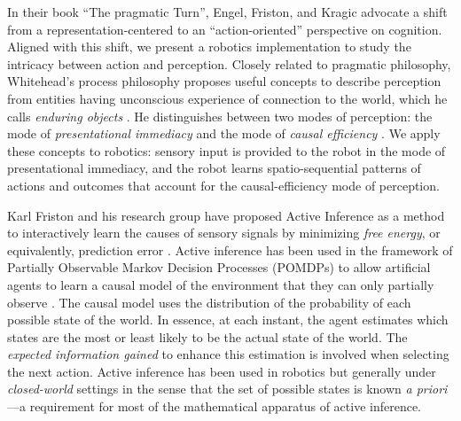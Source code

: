 \documentclass[runningheads]{llncs}
\begin{document}
In their book ``The pragmatic Turn'', Engel, Friston, and Kragic \cite{engel_pragmatic_2015} advocate a shift from a representation-centered to an ``action-oriented'' perspective on cognition.  
Aligned with this shift, we present a robotics implementation to study the intricacy between action and perception.
Closely related to pragmatic philosophy, Whitehead's process philosophy proposes useful concepts to describe perception from entities 
having unconscious experience of connection to the world,
which he calls \textit{enduring objects} \cite{whitehead1929}. 
He distinguishes between two modes of perception: the mode of \textit{presentational immediacy} and the mode of \textit{causal efficiency} \cite{smith_social_2010}. 
We apply these concepts to robotics: sensory input is provided to the robot in the mode of presentational immediacy, and the robot learns spatio-sequential patterns of actions and outcomes that account for the causal-efficiency mode of perception. 


Karl Friston and his research group have proposed Active Inference as a method to interactively  learn the causes of sensory signals  by minimizing \textit{free energy}, or equivalently, prediction error \cite{friston_free-energy_2010}.
Active inference has been used in the framework of Partially Observable Markov Decision Processes (POMDPs) to allow artificial agents to learn a causal model of the environment that they can only partially observe \cite{smith_step-by-step_2022}. 
The causal model uses the distribution of the probability of each possible state of the world. 
In essence, at each instant, the agent estimates which states are the most or least likely to be the actual state of the world.
The \textit{expected information gained} to enhance this estimation is involved when selecting the next action.
Active inference has been used in robotics \cite{lanillos_active_2021} but generally under \textit{closed-world} settings in the sense that the set of possible states is known \textit{a priori}---a requirement for most of the mathematical apparatus of active inference. 
\end{document}
